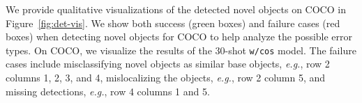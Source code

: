 \begin{table}[!h]
	\centering
	\footnotesize
	\setlength{\tabcolsep}{0.4em}
	\caption{Ablation of scaling factor of cosine similarity. \vspace{1mm}}
	\label{tab:cos_scale}
\end{table}

We provide qualitative visualizations of the detected novel objects on COCO in Figure~\ref{fig:det-vis}.
We show both success (green boxes) and failure cases (red boxes) when detecting novel objects for COCO to help analyze the possible error types.
On COCO, we visualize the results of the 30-shot \texttt{\model w/cos} model.
The failure cases include misclassifying novel objects as similar base objects, \textit{e.g.}, row 2 columns 1, 2, 3, and 4, mislocalizing the objects, \textit{e.g.}, row 2 column 5, and missing detections, \textit{e.g.}, row 4 columns 1 and 5.


